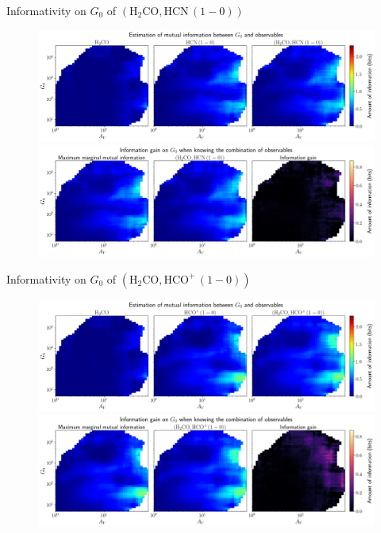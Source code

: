 \documentclass{beamer}
\begin{document}
\begin{frame}{Informativity on $G_0$ of $\left(\mathrm{H_2CO},\mathrm{HCN\,(1-0)}\right)$}
    \begin{figure}
        \centering
        \includegraphics[width=0.95\linewidth]{../mi/g0__h2co_hcn10_mi.png}
        \vfill
        \includegraphics[width=0.95\linewidth]{../mi/g0__h2co_hcn10_mi_gain.png}
    \end{figure}
\end{frame}

\begin{frame}{Informativity on $G_0$ of $\left(\mathrm{H_2CO},\mathrm{HCO^+\,(1-0)}\right)$}
    \begin{figure}
        \centering
        \includegraphics[width=0.95\linewidth]{../mi/g0__h2co_hcop10_mi.png}
        \vfill
        \includegraphics[width=0.95\linewidth]{../mi/g0__h2co_hcop10_mi_gain.png}
    \end{figure}
\end{frame}
\end{document}
